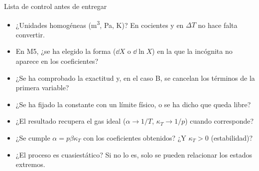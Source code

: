 \begin{recuadro}{Lista de control antes de entregar}
\begin{itemize}[label={\color{acento}$\blacktriangleright$},leftmargin=1.4em,itemsep=4pt]
\item ¿Unidades homogéneas (\si{m^3}, \si{Pa}, \si{K})? En cocientes y en $\Delta T$ no hace falta convertir.
\item En M5, ¿se ha elegido la forma ($\dd X$ o $\dd\ln X$) en la que la incógnita no aparece en los coeficientes?
\item ¿Se ha comprobado la exactitud y, en el caso B, se cancelan los términos de la primera variable?
\item ¿Se ha fijado la constante con un límite físico, o se ha dicho que queda libre?
\item ¿El resultado recupera el gas ideal ($\alpha\to1/T$, $\kappa_T\to1/p$) cuando corresponde?
\item ¿Se cumple $\alpha=p\beta\kappa_T$ con los coeficientes obtenidos? ¿Y $\kappa_T>0$ (estabilidad)?
\item ¿El proceso es cuasiestático? Si no lo es, solo se pueden relacionar los estados extremos.
\end{itemize}
\end{recuadro}
